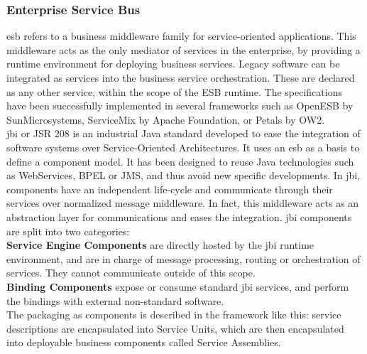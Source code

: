 \subsubsection{Enterprise Service Bus}

\gls{esb} refers to a business middleware family for service-oriented applications. This middleware acts as the only mediator of services in the enterprise, by providing a runtime environment for deploying business services. Legacy software can be integrated as services into the business service orchestration. These are declared as any other service, within the scope of the ESB runtime. The specifications have been successfully implemented in several frameworks such as OpenESB by SunMicrosystems, ServiceMix by Apache Foundation, or Petals by OW2.\\
\gls{jbi} or JSR 208 is an industrial Java standard developed to ease the integration of software systems over Service-Oriented Architectures. It uses an \gls{esb} as a basis to define a component model. It has been designed to reuse Java technologies such as WebServices, BPEL or JMS, and thus avoid new specific developments.  
In \gls{jbi}, components have an independent life-cycle and communicate through their services over normalized message middleware. In fact, this middleware acts as an abstraction layer for communications and eases the integration. \gls{jbi} components are split into two categories:\\
{\bf Service Engine Components} are directly hosted by the \gls{jbi} runtime environment, and are in charge of message processing, routing or orchestration of services. They cannot communicate outside of this scope.\\
{\bf Binding Components} expose or consume standard \gls{jbi} services, and perform the bindings with external non-standard software.\\
The packaging as components is described in the framework like this: service descriptions are encapsulated into Service Units, which are then encapsulated into deployable business components called Service Assemblies.\\
 
